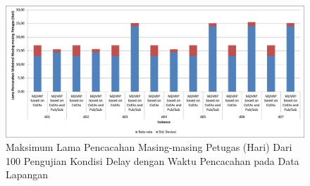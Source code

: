 \begin{figure}[!]
	\centering
	\includegraphics[width=\textwidth]{Resources/Images/test_result_delay_real_tw_mean_stdev_of_total_time}
	\captionsetup{format=hang}
	\caption{Maksimum Lama Pencacahan Masing-masing Petugas (Hari) Dari 100 Pengujian Kondisi Delay dengan Waktu Pencacahan pada Data Lapangan}
	\label{fig:test_result_delay_real_tw_mean_stdev_of_total_time}
\end{figure}



